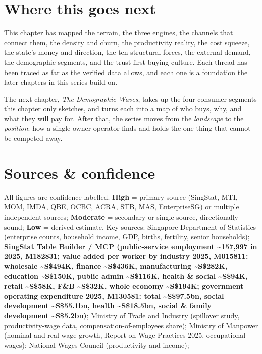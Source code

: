 \documentclass[10pt,twoside,openany]{memoir}
\begin{document}
{{{{{{{{{{{{{{\chapter{Where this goes next}\label{where-this-goes-next}

This chapter has mapped the terrain, the three engines, the channels
that connect them, the density and churn, the productivity reality, the
cost squeeze, the state's money and direction, the ten structural
forces, the external demand, the demographic segments, and the
trust-first buying culture. Each thread has been traced as far as the
verified data allows, and each one is a foundation the later chapters in
this series build on.

The next chapter, \emph{The Demographic Waves}, takes up the four
consumer segments this chapter only sketches, and turns each into a map
of who buys, why, and what they will pay for. After that, the series
moves from the \emph{landscape} to the \emph{position}: how a single
owner-operator finds and holds the one thing that cannot be competed
away.

\FloatBarrier
\chapter{Sources \& confidence}\label{sources-confidence}

All figures are confidence-labelled. \textbf{High} = primary source
(SingStat, MTI, MOM, IMDA, QBE, OCBC, ACRA, STB, MAS, EnterpriseSG) or
multiple independent sources; \textbf{Moderate} = secondary or
single-source, directionally sound; \textbf{Low} = derived estimate. Key
sources: Singapore Department of Statistics (enterprise counts,
household income, GDP, births, fertility, senior households);
\textbf{SingStat Table Builder / MCP (public-service employment
\textasciitilde157,997 in 2025, M182831; value added per worker by
industry 2025, M015811: wholesale \textasciitilde S\$494K, finance
\textasciitilde S\$436K, manufacturing \textasciitilde S\$282K,
education \textasciitilde S\$150K, public admin \textasciitilde S\$116K,
health \& social \textasciitilde S\$94K, retail \textasciitilde S\$58K,
F\&B \textasciitilde S\$32K, whole economy \textasciitilde S\$194K;
government operating expenditure 2025, M130581: total
\textasciitilde S\$97.5bn, social development \textasciitilde S\$55.1bn,
health \textasciitilde S\$18.5bn, social \& family development
\textasciitilde S\$5.2bn)}; Ministry of Trade and Industry (spillover
study, productivity-wage data, compensation-of-employees share);
Ministry of Manpower (nominal and real wage growth, Report on Wage
Practices 2025, occupational wages); National Wages Council
(productivity and income);

}}}}}}}}}}}}}}
\end{document}

